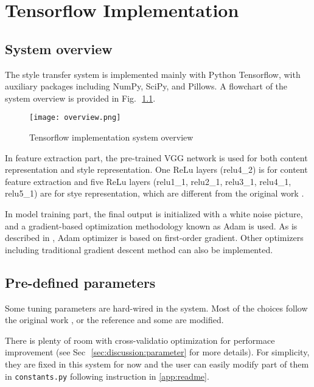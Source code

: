 
\chapter{Tensorflow Implementation}
\label{chap:implementation}


\section{System overview}
\label{sec:implementation:overview}

The style transfer system is implemented mainly with Python Tensorflow,
with auxiliary packages including NumPy, SciPy, and Pillows.
A flowchart of the system overview is provided in Fig.\,~\ref{fig:overview}.

    \begin{figure}[!hbt]
    \center
    \texttt{[image: overview.png]}
    \caption{Tensorflow implementation system overview}
    \label{fig:overview}
    \end{figure}

In feature extraction part, the pre-trained VGG network is used for both
content representation and style representation.
One ReLu layers (relu4\_2) is for content feature extraction
and five ReLu layers (relu1\_1, relu2\_1, relu3\_1, relu4\_1, relu5\_1) are for 
stye representation, which are different from the original work \cite{Gatys:2016gj}.

In model training part, the final output is initialized with a white noise picture,
and a gradient-based optimization methodology known as Adam is used.
As is described in \cite{kingma2014adam}, Adam optimizer is based on first-order gradient.
Other optimizers including traditional gradient descent method can also be implemented.


\section{Pre-defined parameters}

Some tuning parameters are hard-wired in the system.
Most of the choices follow the original work \cite{Gatys:2016gj},
or the reference \cite{athalye2015neuralstyle} and some are modified.

There is plenty of room with cross-validatio optimization for performace improvement
(see Sec\,~\ref{sec:discussion:parameter} for more details).
For simplicity, they are fixed in this system for now and the user can easily modify part of them
in \texttt{constants.py} following instruction in \ref{app:readme}.

